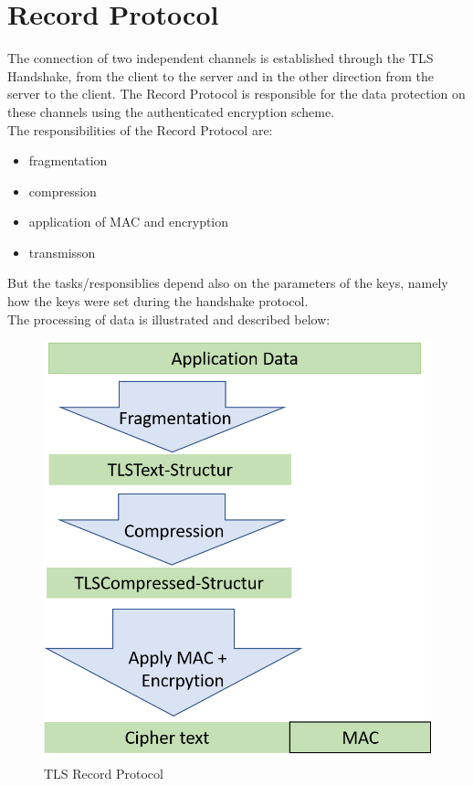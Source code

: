 \section{Record Protocol}
\label{sec:record_protocol}

The connection of two independent channels is established through the TLS Handshake, from the client to the server and in the other direction from the server to the client. The Record Protocol is responsible for the data protection on these channels using the authenticated encryption scheme.\\
The responsibilities of the Record Protocol are:
\begin{itemize}
	\item fragmentation
	\item compression
	\item application of MAC and encryption
	\item transmisson 
\end{itemize}
But the tasks/responsiblies depend also on the parameters of the keys, namely how the keys were set during the handshake protocol. \\

The processing of data is illustrated and described below:      

\begin{figure}[H]
	\centering
		\includegraphics[scale=0.5]{images/tls_recordprotocol.png}
	\caption{TLS Record Protocol}
	\label{fig:tls_recordprotocol}
\end{figure}

